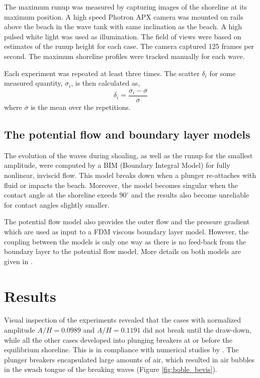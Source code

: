 \documentclass[a4paper, 11pt, english, twoside, openright]{article}
\newcommand{\sidenote}[1]{\marginpar{\footnotesize #1}}
\begin{document}
The maximum runup was measured by capturing images of the shoreline at its maximum position. A high speed Photron APX  camera was mounted on rails above the beach in the wave tank with same inclination as the beach. A high pulsed white light was used as illumination. The field of views were based on estimates of the runup height for each case. The camera captured 125 frames per second. The maximum shoreline profiles were tracked manually for each wave.


Each experiment was repeated at least three times.
The scatter $\delta_i$ for some measured quantity, $\sigma_i$, is then calculated as,
\begin{equation}
\delta_i=\frac{\sigma_i-\overline{\sigma}}{\overline{\sigma}}
\end{equation}
where $\overline{\sigma}$ is the mean over the  repetitions.

\subsection{The potential flow and boundary layer models}
The evolution of the waves during shoaling, as well as the runup for the smallest amplitude, were 
computed by a BIM (Boundary Integral Model) for fully nonlinear, inviscid flow.
This model breaks down when a plunger re-attaches with fluid or impacts the beach. Moreover, the
model  becomes
singular when the contact angle at the shoreline exeeds $90^\circ$  and the results also become unreliable
for contact angles slightly smaller.  

The potential flow model also provides the outer flow and the pressure gradient
which are used as input to a FDM viscous boundary layer model. However, the coupling between the
models is only one way as  there is no feed-back from the boundary layer to the potential
flow model.   
More details on both models are given in  \cite{pedersen2013runup}.\sidenote{Grid refinement?}   
 
\section{Results}
\label{result}

Visual inspection of the experiments revealed that the cases with normalized amplitude $A/H=0.0989$ and $A/H=0.1191$ did not break until the draw-down, while all the other cases developed into plunging breakers at or before the equilibrium shoreline. This is in compliance with numerical studies by \cite{grilli1997breaking}. The plunger breakers encapsulated large amounts of air, which resulted in air bubbles in the swash tongue of the breaking waves (Figure \ref{fig:boble_bevis}).
\end{document}
